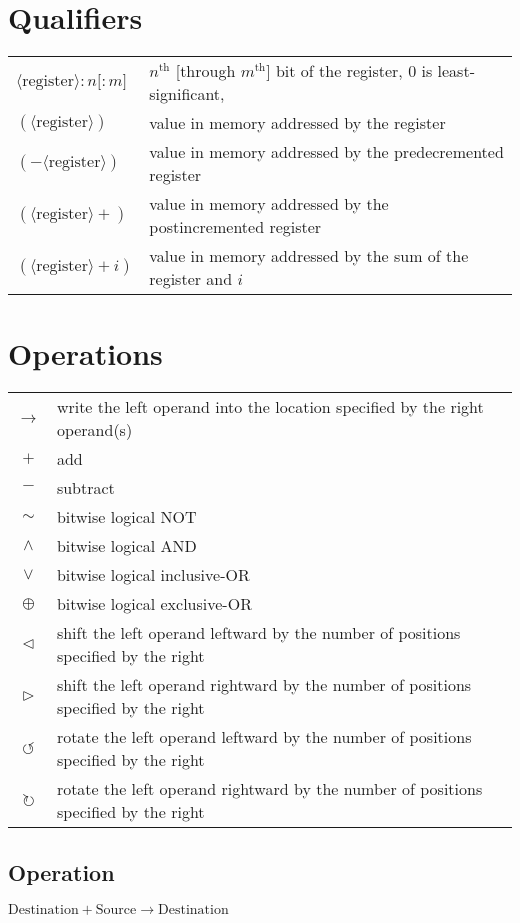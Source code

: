 \documentclass[12pt,english]{book}
\newcommand*{\instruction}[2][]{%
  \clearpage
  \thispagestyle{fancy}%
  \fancyhf[HL,HR]{\huge{#2}}%
  \fancyhf[HC]{#1}\addtocounter{section}{1}\noindent
}
\begin{document}
\section*{Qualifiers}
\begin{tabular}{ll}
  \(\langle\text{register}\rangle{:}n\text{[}{:}m\text{]}\)
  &\(n^{\text{th}}\) [through \(m^{\text{th}}\)] bit of the register,
  0 is least-significant,\\
  \((\langle\text{register}\rangle)\)
  &value in memory addressed by the register\\
  \((-\langle\text{register}\rangle)\)
  &value in memory addressed by the predecremented register\\
  \((\langle\text{register}\rangle+)\)
  &value in memory addressed by the postincremented register\\
  \((\langle\text{register}\rangle+i)\)
  &value in memory addressed by the sum of the register
  and \texttt{\(i\)}
\end{tabular}
\section*{Operations}
\begin{tabular}{cl}
  \(\rightarrow\)
  &write the left operand into the location specified by the right
  operand(s)\\
  \(+\)&add\\
  \(-\)&subtract\\
  \(\sim\)&bitwise logical NOT\\
  \(\wedge\)&bitwise logical AND\\
  \(\vee\)&bitwise logical inclusive-OR\\
  \(\oplus\)&bitwise logical exclusive-OR\\
  \(\triangleleft\)&shift the left operand leftward
  by the number of positions specified by the right\\
  \(\triangleright\)&shift the left operand rightward
  by the number of positions specified by the right\\
  \(\circlearrowleft\)&rotate the left operand leftward
  by the number of positions specified by the right\\
  \(\circlearrowright\)&rotate the left operand rightward
  by the number of positions specified by the right
\end{tabular}


\instruction[Add]{ADD}
\subsection*{Operation}
\(\text{Destination}+\text{Source}\rightarrow\text{Destination}\)
\end{document}

